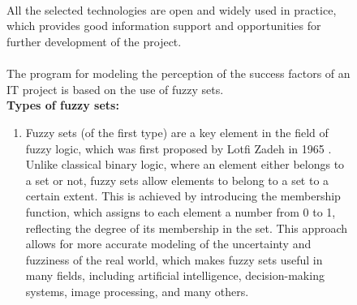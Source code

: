 \documentclass{article}
\begin{document}
\begin{figure}[!t]
\begin{minipage}{0.49\textwidth}
            ~\\
            ~\\
            ~\\
            ~\\
            ~\\
            ~\\
            ~\\
            ~\\
            ~\\
            ~\\
            ~\\
            ~\\
            ~\\
            ~\\
            ~\\
            ~\\
            ~\\
            ~\\
            ~\\
            ~\\
            ~\\
            ~\\
            ~\\
            ~\\
            ~\\
        \end{minipage}
        \begin{minipage}{0.49\textwidth}
            All the selected technologies are open and widely used in practice, which provides good information support and opportunities for further development of the project.\\
            ~\\
            The program for modeling the perception of the success factors of an IT project is based on the use of fuzzy sets.\\
            \textbf{Types of fuzzy sets:}
            \begin{enumerate}
                \item Fuzzy sets (of the first type) are a key element in the field of fuzzy logic, which was first proposed by Lotfi Zadeh in 1965 \cite{litlink21}. Unlike classical binary logic, where an element either belongs to a set or not, fuzzy sets allow elements to belong to a set to a certain extent. This is achieved by introducing the membership function, which assigns to each element a number from 0 to 1, reflecting the degree of its membership in the set. This approach allows for more accurate modeling of the uncertainty and fuzziness of the real world, which makes fuzzy sets useful in many fields, including artificial intelligence, decision-making systems, image processing, and many others.\\

\end{enumerate}
\end{minipage}
\end{figure}
\end{document}
